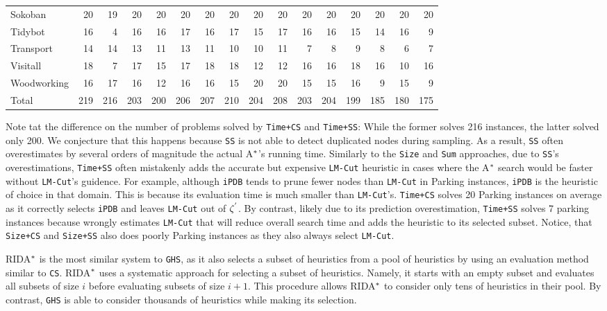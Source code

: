 \begin{table}[htb]
\begin{tabular}{lrrrrrrrrrrrrrrr}
Sokoban&       20&     19&    20&   20&   20&  20&  20&   20&   20&  20&  20&   20&  20&  20&  20\\
Tidybot&       16&      4&    16&   16&   17&  16&  17&   15&   17&  16&  16&   15&  14&  16&   9\\
Transport&     14&     14&    13&   11&   13&  11&  10&   10&   11&   7&   8&    9&   8&   6&   7\\
Visitall&      18&      7&    17&   15&   17&  18&  18&   12&   12&  16&  16&   18&  16&  10&  16\\
Woodworking&   16&     17&    16&   12&   16&  16&  15&   20&   20&  15&  15&   16&   9&  15&   9\\ \hline
Total&        219&    216&   203&  200&  206& 207& 210&  204&  208& 203& 204&  199& 185& 180& 175\\ \hline
\end{tabular}
\label{tb_two}
\end{table}

Note tat the difference on the number of problems solved by \texttt{Time+CS} and \texttt{Time+SS}: While the former solves 216 instances, the latter solved only 200. We conjecture that this happens because \texttt{SS} is not able to detect duplicated nodes during sampling. As a result, \texttt{SS} often overestimates by several orders of magnitude the actual A$\sp{*}$'s running time. Similarly to the \texttt{Size} and \texttt{Sum} approaches, due to \texttt{SS}'s overestimations, \texttt{Time+SS} often mistakenly adds the accurate but expensive \texttt{LM-Cut} heuristic in cases where the A$\sp{*}$ search would be faster without \texttt{LM-Cut}'s guidence. For example, although \texttt{iPDB} tends to prune fewer nodes than \texttt{LM-Cut} in Parking instances, \texttt{iPDB} is the heuristic of choice in that domain. This is because its evaluation time is much smaller than \texttt{LM-Cut}'s. \texttt{Time+CS} solves 20 Parking instances on average as it correctly selects \texttt{iPDB} and leaves \texttt{LM-Cut} out of $\zeta\sp{'}$. By contrast, likely due to its prediction overestimation, \texttt{Time+SS} solves 7 parking instances because wrongly estimates \texttt{LM-Cut} that will reduce overall search time and adds the heuristic to its selected subset. Notice, that \texttt{Size+CS} and \texttt{Size+SS} also does poorly Parking instances as they also always select \texttt{LM-Cut}.

RIDA$\sp{*}$ is the most similar system to \texttt{GHS}, as it also selects a subset of heuristics from a pool of heuristics by using an evaluation method similar to \texttt{CS}. RIDA$\sp{*}$ uses a systematic approach for selecting a subset of heuristics. Namely, it starts with an empty subset and evaluates all subsets of size $i$ before evaluating subsets of size $i+1$. This procedure allows RIDA$\sp{*}$ to consider only tens of heuristics in their pool. By contrast, \texttt{GHS} is able to consider thousands of heuristics while making its selection.

